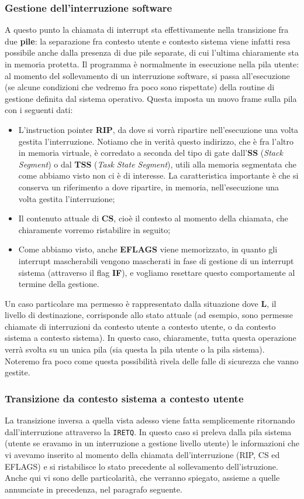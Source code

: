 \documentclass[a4paper,11pt]{article}
\begin{document}
\subsubsection{Gestione dell'interruzione software}
A questo punto la chiamata di interrupt sta effettivamente nella transizione fra due \textbf{pile}: la separazione fra contesto utente e contesto sistema viene infatti resa possibile anche dalla presenza di due pile separate, di cui l'ultima chiaramente sta in memoria protetta.
Il programma è normalmente in esecuzione nella pila utente: al momento del sollevamento di un interruzione software, si passa all'esecuzione (se alcune condizioni che vedremo fra poco sono rispettate) della routine di gestione definita dal sistema operativo.
Questa imposta un nuovo frame sulla pila con i seguenti dati:
\begin{itemize}
	\item L'instruction pointer \textbf{RIP}, da dove si vorrà ripartire nell'esecuzione una volta gestita l'interruzione.
		Notiamo che in verità questo indirizzo, che è fra l'altro in memoria virtuale, è corredato a seconda del tipo di gate dall'\textbf{SS} (\textit{Stack Segment}) o dal \textbf{TSS} (\textit{Task State Segment}), utili alla memoria segmentata che come abbiamo visto non ci è di interesse. La caratteristica importante è che si conserva un riferimento a dove ripartire, in memoria, nell'esecuzione una volta gestita l'interruzione;
	\item Il contenuto attuale di \textbf{CS}, cioè il contesto al momento della chiamata, che chiaramente vorremo ristabilire in seguito;
	\item Come abbiamo visto, anche \textbf{EFLAGS} viene memorizzato, in quanto gli interrupt mascherabili vengono mascherati in fase di gestione di un interrupt sistema (attraverso il flag \textbf{IF}), e vogliamo resettare questo comportamente al termine della gestione.
\end{itemize}

Un caso particolare ma permesso è rappresentato dalla situazione dove \textbf{L}, il livello di destinazione, corrisponde allo stato attuale (ad esempio, sono permesse chiamate di interruzioni da contesto utente a contesto utente, o da contesto sistema a contesto sistema).
In questo caso, chiaramente, tutta questa operazione verrà svolta su un unica pila (sia questa la pila utente o la pila sistema).
Noteremo fra poco come questa possibilità rivela delle falle di sicurezza che vanno gestite.

\subsubsection{Transizione da contesto sistema a contesto utente}
La transizione inversa a quella vista adesso viene fatta semplicemente ritornando dall'interruzione attraverso la \lstinline|IRETQ|.
In questo caso si preleva dalla pila sistema (utente se eravamo in un interruzione a gestione livello utente) le informazioni che vi avevamo inserito al momento della chiamata dell'interruzione (RIP, CS ed EFLAGS) e si ristabilisce lo stato precedente al sollevamento dell'istruzione.
Anche qui vi sono delle particolarità, che verranno spiegato, assieme a quelle annunciate in precedenza, nel paragrafo seguente.
\end{document}
